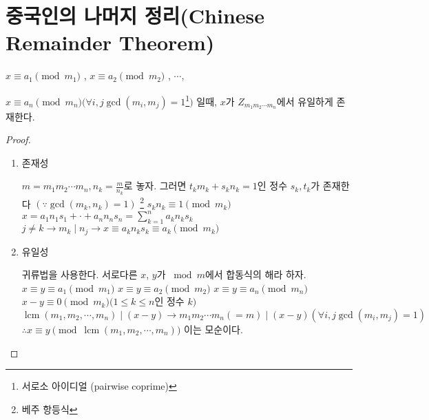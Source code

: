 

\section{중국인의 나머지 정리(Chinese Remainder Theorem)}

\begin{justbox}
    $x \equiv a_1 \pmod{m_1}$ , $x \equiv a_2 \pmod{m_2}$ , $\cdots$, 

    $x \equiv a_n \pmod{m_n} ( \forall i,j \gcd(m_{i} ,m_{j}) = 1$\footnote{서로소 아이디얼 (pairwise coprime)}$)$
    일때, $x$가 $ Z_{m_{1}m_{2} \cdots m_{n}}$에서 유일하게 존재한다.
\end{justbox}

\begin{proof}

\begin{enumerate}
    \item {존재성}

$m = m_{1}m_{2} \cdots m_{n}, n_{k} = \frac{m}{n_k}$로 놓자. 
그러면 $t_{k}m_{k} + s_{k}n_{k} = 1$인 정수 $s_{k}, t_{k}$가 존재한다 $( \because \gcd( m_{k}, n_{k}) = 1 )$ 
\footnote{베주 항등식}
$s_{k}n_{k} \equiv 1 \pmod{m_k}$
$x=a_{1}n_{1}s_{1} + \cdot + a_{n}n_{n}s_{n} = \sum_{k=1}^n a_{k}n_{k}s_{k}$
$j \ne k \longrightarrow m_{k} \mid n_{j} \longrightarrow x \equiv a_{k}n_{k}s_{k} \equiv a_{k} \pmod{m_{k}}$
    
\item{유일성}

귀류법을 사용한다.
서로다른 $x$, $y$가 $\bmod m$에서 합동식의 해라 하자.
$x \equiv y\equiv a_1 \pmod{m_1}$
$x \equiv y\equiv a_2 \pmod{m_2}$
$x \equiv y\equiv a_n \pmod{m_n}$
$x - y \equiv 0 \pmod{m_k} ( 1\le k \le n$인 정수 $k )$
$\operatorname{lcm}(m_1, m_2, \cdots, m_n) \mid (x-y) \longrightarrow m_{1} m_{2} \cdots m_{n}( = m ) \mid (x-y) (\forall i,j \gcd(m_{i} ,m_{j}) = 1)$
$\therefore x \equiv y \pmod{\operatorname{lcm}(m_1, m_2, \cdots, m_n)}$
이는 모순이다.    
\end{enumerate}
\end{proof}

